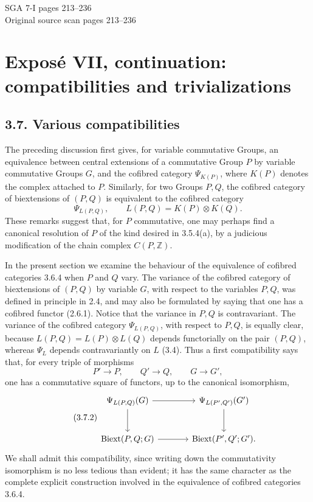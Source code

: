 \documentclass[11pt]{article}
\providecommand{\Biext}{\operatorname{Biext}}
\begin{document}
\begin{center}
{\Large SGA 7-I pages 213--236}\\[0.35em]
{\large Original source scan pages 213--236}
\end{center}


\section*{Exposé VII, continuation: compatibilities and trivializations}

\subsection*{3.7. Various compatibilities}

The preceding discussion first gives, for variable commutative Groups, an equivalence between central extensions of a commutative Group \(P\) by variable commutative Groups \(G\), and the cofibred category \(\Psi_{K(P)}\), where \(K(P)\) denotes the complex attached to \(P\).  Similarly, for two Groups \(P,Q\), the cofibred category of biextensions of \((P,Q)\) is equivalent to the cofibred category
\[
        \Psi_{L(P,Q)},\qquad L(P,Q)=K(P)\otimes K(Q).
\]
These remarks suggest that, for \(P\) commutative, one may perhaps find a canonical resolution of \(P\) of the kind desired in 3.5.4(a), by a judicious modification of the chain complex \(C(P,\mathbb Z)\).

In the present section we examine the behaviour of the equivalence of cofibred categories 3.6.4 when \(P\) and \(Q\) vary.  The variance of the cofibred category of biextensions of \((P,Q)\) by variable \(G\), with respect to the variables \(P,Q\), was defined in principle in 2.4, and may also be formulated by saying that one has a cofibred functor (2.6.1).  Notice that the variance in \(P,Q\) is contravariant.  The variance of the cofibred category \(\Psi_{L(P,Q)}\), with respect to \(P,Q\), is equally clear, because \(L(P,Q)=L(P)\otimes L(Q)\) depends functorially on the pair \((P,Q)\), whereas \(\Psi_L\) depends contravariantly on \(L\) (3.4).  Thus a first compatibility says that, for every triple of morphisms
\begin{equation}\tag{3.7.1}
        P'\longrightarrow P,
        \qquad Q'\longrightarrow Q,
        \qquad G\longrightarrow G',
\end{equation}
one has a commutative square of functors, up to the canonical isomorphism,
\begin{equation}\tag{3.7.2}
\begin{tikzcd}[column sep=large,row sep=large]
 \Psi_{L(P,Q)}(G) \arrow[r] \arrow[d] & \Psi_{L(P',Q')}(G') \arrow[d] \\
 \Biext(P,Q;G) \arrow[r] & \Biext(P',Q';G').
\end{tikzcd}
\end{equation}
We shall admit this compatibility, since writing down the commutativity isomorphism is no less tedious than evident; it has the same character as the complete explicit construction involved in the equivalence of cofibred categories 3.6.4.
\end{document}
